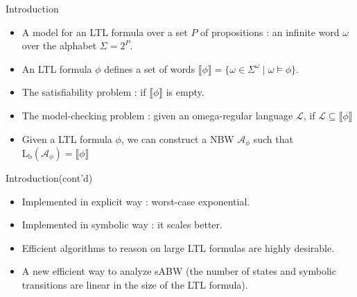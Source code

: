 \documentclass[12pt]{beamer}
\author{林宏陽}
\begin{document}
\begin{frame}
	\maketitle
\end{frame}

\begin{frame}{Introduction}
	\begin{itemize}
		\item A model for an LTL formula over a set $P$ of propositions : an infinite word $\omega$ over the alphabet $\Sigma = 2^{P}$.
		\item An LTL formula $\phi$ defines a set of words $\llbracket \phi \rrbracket = \{\omega \in \Sigma^{\omega} \mid \omega \models \phi\}$.
		\item The satisfiability problem : if $\llbracket \phi \rrbracket$ is empty.
		\item The model-checking problem : given an omega-regular language $\mathcal{L}$, if $\mathcal{L} \subseteq \llbracket \phi \rrbracket$
		\item Given a LTL formula $\phi$, we can construct a NBW $\mathcal{A}_{\phi}$ such that $\text{L}_{\text{b}}(\mathcal{A}_{\phi}) = \llbracket \phi \rrbracket$
	\end{itemize}
\end{frame}

\begin{frame}{Introduction(cont'd)}
	\begin{itemize}
		\item Implemented in explicit way : worst-case exponential.
		\item Implemented in symbolic way : it scales better.
		\item Efficient algorithms to reason on large LTL formulas are highly desirable.
		\item A new efficient way to analyze sABW (the number of states and symbolic transitions are linear in the size of the LTL formula).
	\end{itemize}
\end{frame}
\end{document}
